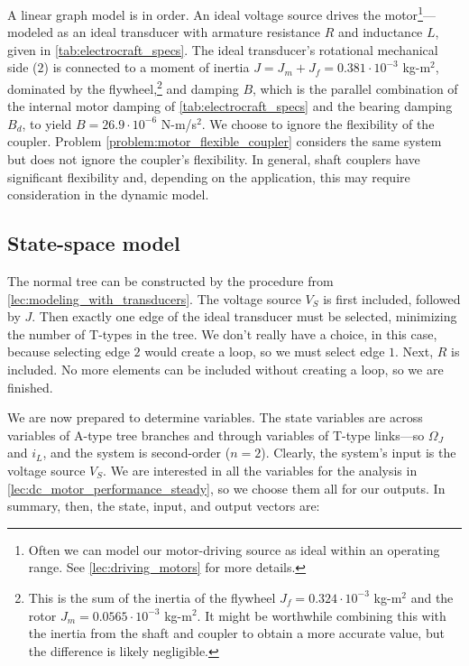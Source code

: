 \documentclass[dynamic_systems.tex]{subfiles}
\begin{document}
A linear graph model is in order.
An ideal voltage source drives the motor\footnote{Often we can model our motor-driving source as ideal within an operating range. See \autoref{lec:driving_motors} for more details.}---modeled as an ideal transducer with armature resistance $R$ and inductance $L$, given in \autoref{tab:electrocraft_specs}.
The ideal transducer's rotational mechanical side ($2$) is connected to a moment of inertia
$J = J_m + J_f = 0.381\cdot10^{-3}$ kg-m$^2$,
dominated by the flywheel,\footnote{This is the sum of the inertia of the flywheel $J_f = 0.324\cdot 10^{-3}$ kg-m$^2$ and the rotor $J_m = 0.0565\cdot 10^{-3}$ kg-m$^2$. It might be worthwhile combining this with the inertia from the shaft and coupler to obtain a more accurate value, but the difference is likely negligible.}
and damping $B$, which is the parallel combination of the internal motor damping of \autoref{tab:electrocraft_specs} and the bearing damping $B_d$, to yield $B = 26.9\cdot 10^{-6}$ N-m/s$^2$.
We choose to ignore the flexibility of the coupler.
Problem \ref{problem:motor_flexible_coupler} considers the same system but does not ignore the coupler's flexibility.
In general, shaft couplers have significant flexibility and, depending on the application, this may require consideration in the dynamic model.
\endgroup

\subsection{State-space model}
\tags{}

The normal tree can be constructed by the procedure from \autoref{lec:modeling_with_transducers}.
The voltage source $V_S$ is first included, followed by $J$.
Then exactly one edge of the ideal transducer must be selected, minimizing the number of T-types in the tree.
We don't really have a choice, in this case, because selecting edge $2$ would create a loop, so we must select edge $1$.
Next, $R$ is included.
No more elements can be included without creating a loop, so we are finished.

We are now prepared to determine variables.
The state variables are across variables of A-type tree branches and through variables of T-type links---so $\Omega_J$ and $i_L$, and the system is second-order ($n=2$).
Clearly, the system's input is the voltage source $V_S$.
We are interested in all the variables for the analysis in \autoref{lec:dc_motor_performance_steady}, so we choose them all for our outputs.
In summary, then, the state, input, and output vectors are:
\end{document}
